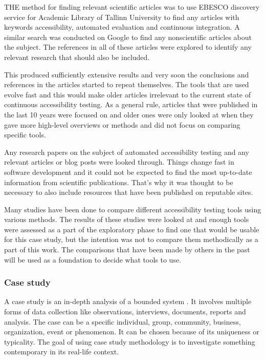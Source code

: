 \documentclass{master_thesis}
\begin{document}
THE method for finding relevant scientific articles was to use EBESCO discovery service for Academic Library of Tallinn University to find any articles with keywords accessibility, automated evaluation and continuous integration. A similar search was conducted on Google to find any nonscientific articles about the subject. The references in all of these articles were explored to identify any relevant research that should also be included.

This produced sufficiently extensive results and very soon the conclusions and references in the articles started to repeat themselves. The tools that are used evolve fast and this would make older articles irrelevant to the current state of continuous accessibility testing. As a general rule, articles that were published in the last 10 years were focused on and older ones were only looked at when they gave more high-level overviews or methods and did not focus on comparing specific tools.

Any research papers on the subject of automated accessibility testing and any relevant articles or blog posts were looked through. Things change fast in software development and it could not be expected to find the most up-to-date information from scientific publications. That's why it was thought to be necessary to also include resources that have been published on reputable sites.

Many studies \citep{Alsaeedi2020, Ismailova2022, Sane2021, Vigo2013, RybinKoob2022, Duran2017} have been done to compare different accessibility testing tools using various methods. The results of these studies were looked at and enough tools were assessed as a part of the exploratory phase to find one that would be usable for this case study, but the intention was not to compare them methodically as a part of this work. The comparisons that have been made by others in the past will be used as a foundation to decide what tools to use.

\subsubsection{Case study}

A case study is an in-depth analysis of a bounded system \citep{Range2023}. It involves multiple forms of data collection like observations, interviews, documents, reports and analysis. The case can be a specific individual, group, community, business, organization, event or phenomenon. It can be chosen because of its uniqueness or typicality. The goal of using case study methodology is to investigate something contemporary in its real-life context.
\end{document}
